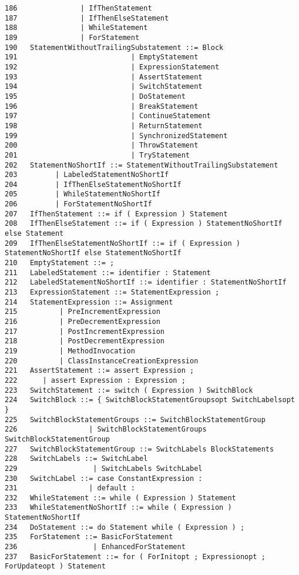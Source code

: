 {\begin{verbatim}
186               | IfThenStatement
187               | IfThenElseStatement
188               | WhileStatement
189               | ForStatement
190   StatementWithoutTrailingSubstatement ::= Block
191                           | EmptyStatement
192                           | ExpressionStatement
193                           | AssertStatement
194                           | SwitchStatement
195                           | DoStatement
196                           | BreakStatement
197                           | ContinueStatement
198                           | ReturnStatement
199                           | SynchronizedStatement
200                           | ThrowStatement
201                           | TryStatement
202   StatementNoShortIf ::= StatementWithoutTrailingSubstatement
203         | LabeledStatementNoShortIf
204         | IfThenElseStatementNoShortIf
205         | WhileStatementNoShortIf
206         | ForStatementNoShortIf
207   IfThenStatement ::= if ( Expression ) Statement
208   IfThenElseStatement ::= if ( Expression ) StatementNoShortIf else Statement
209   IfThenElseStatementNoShortIf ::= if ( Expression ) StatementNoShortIf else StatementNoShortIf
210   EmptyStatement ::= ;
211   LabeledStatement ::= identifier : Statement
212   LabeledStatementNoShortIf ::= identifier : StatementNoShortIf
213   ExpressionStatement ::= StatementExpression ;
214   StatementExpression ::= Assignment
215          | PreIncrementExpression
216          | PreDecrementExpression
217          | PostIncrementExpression
218          | PostDecrementExpression
219          | MethodInvocation
220          | ClassInstanceCreationExpression
221   AssertStatement ::= assert Expression ;
222      | assert Expression : Expression ;
223   SwitchStatement ::= switch ( Expression ) SwitchBlock
224   SwitchBlock ::= { SwitchBlockStatementGroupsopt SwitchLabelsopt }
225   SwitchBlockStatementGroups ::= SwitchBlockStatementGroup
226                 | SwitchBlockStatementGroups SwitchBlockStatementGroup
227   SwitchBlockStatementGroup ::= SwitchLabels BlockStatements
228   SwitchLabels ::= SwitchLabel
229                  | SwitchLabels SwitchLabel
230   SwitchLabel ::= case ConstantExpression :
231                 | default :
232   WhileStatement ::= while ( Expression ) Statement
233   WhileStatementNoShortIf ::= while ( Expression ) StatementNoShortIf
234   DoStatement ::= do Statement while ( Expression ) ;
235   ForStatement ::= BasicForStatement
236                  | EnhancedForStatement
237   BasicForStatement ::= for ( ForInitopt ; Expressionopt ; ForUpdateopt ) Statement

\end{verbatim}}
